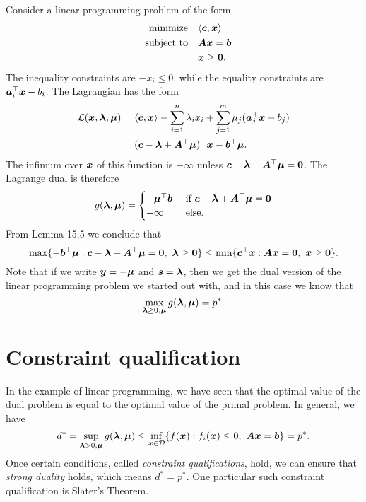 \begin{example}
 Consider a linear programming problem of the form
 \begin{align*}
  \text{minimize}\quad & \langle {\bm{c}}, {\bm{x}} \rangle\\
  \quad\text{subject to}\quad & \bm{A}\bm{x}=\bm{b}\\
  & \bm{x}\geq \bm{0}.
 \end{align*}
The inequality constraints are $-x_i\leq 0$, while the equality constraints are $\bm{a}_i^{\top}\bm{x}-b_i$. The Lagrangian has the form
\begin{align*}
 \mathcal{L}(\bm{x},\bm{\lambda},\bm{\mu}) &= \langle {\bm{c}}, {\bm{x}} \rangle-\sum_{i=1}^n \lambda_i x_i + \sum_{j=1}^m \mu_j(\bm{a}_j^{\top}\bm{x}-b_j)\\
 &= (\bm{c}-\bm{\lambda}+\bm{A}^{\top}\bm{\mu})^{\top}\bm{x}-\bm{b}^{\top}\bm{\mu}.
\end{align*}
The infimum over $\bm{x}$ of this function is $-\infty$ unless $\bm{c}-\bm{\lambda}+\bm{A}^{\top}\bm{\mu}= \bm{0}$. The Lagrange dual is therefore
\begin{equation*}
 g(\bm{\lambda},\bm{\mu}) = \begin{cases} 
                               -\bm{\mu}^{\top}\bm{b} & \text{ if } \bm{c}-\bm{\lambda}+\bm{A}^{\top}\bm{\mu}=\bm{0}\\
                               -\infty & \text{ else.}
                              \end{cases}
\end{equation*}
From Lemma 15.5 we conclude that
\begin{equation*}
 \max \{-\vct{b}^{\trans}\vct{\mu} \mid \vct{c}-\vct{\lambda}+\mtx{A}^{\trans}\vct{\mu}=\zerovct, \ \vct{\lambda}\geq \zerovct\} \leq \min \{\vct{c}^{\trans}\vct{x} \mid \mtx{A}\vct{x}=\zerovct, \ \vct{x}\geq \zerovct\}.
\end{equation*}
Note that if we write $\bm{y}=-\bm{\mu}$ and $\bm{s}=\bm{\lambda}$, then we get the dual version of the linear programming problem we started out with, and in this case we know that 
\begin{equation*}
 \max_{\bm{\lambda}\geq \bm{0},\bm{\mu}} g(\bm{\lambda},\bm{\mu}) = p^*.
\end{equation*}
\end{example}


\section{Constraint qualification}
In the example of linear programming, we have seen that the optimal value of the dual problem is equal to the optimal value of the primal problem. In general, we have
\begin{equation*}
 d^* = \sup_{\vct{\lambda}>0,\vct{\mu}} g(\vct{\lambda},\vct{\mu}) \leq \inf_{\vct{x}\in \mathcal{D}} \{f(\vct{x}) \mid f_i(\vct{x})\leq 0, \ \mtx{A}\vct{x}=\vct{b}\}=p^*.
\end{equation*}
Once certain conditions, called {\em constraint qualifications}, hold, we can ensure that {\em strong duality} holds, which means $d^*=p^*$. One particular such constraint qualification is Slater's Theorem.

